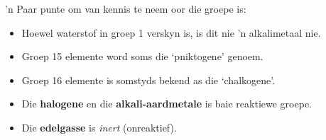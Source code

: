 'n Paar punte om van kennis te neem oor die groepe is:
        \label{m38757*id261581}\begin{itemize}[noitemsep]
            \label{m38757*uid135}\item Hoewel waterstof in groep 1 verskyn is, is dit nie 'n alkalimetaal nie.
\item Groep 15 elemente word soms die ‘pniktogene’ genoem.
\label{m38757*id6232}\item Groep 16 elemente is somstyds bekend as die ‘chalkogene’.
\label{m38757*uid142}\item Die \textbf{halogene} en die \textbf{alkali-aardmetale} is baie reaktiewe groepe.
\label{m38757*uid143}\item Die \textbf{edelgasse} is \textsl{inert} (onreaktief).   
\end{itemize}            

